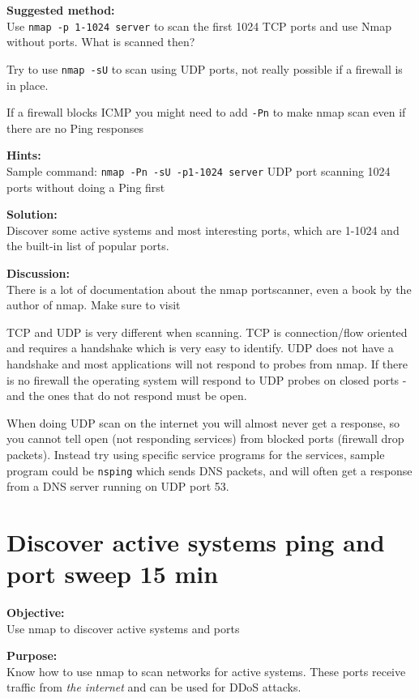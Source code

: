 \documentclass[a4paper,11pt,notitlepage]{report}
\begin{document}
{\bf Suggested method:}\\
Use \verb+nmap -p 1-1024 server+ to scan the first 1024 TCP
ports and use Nmap without ports. What is scanned then?

Try to use \verb+nmap -sU+ to scan using UDP ports, not really possible if a firewall is in place.

If a firewall blocks ICMP you might need to add \verb+-Pn+ to make nmap scan even if there are no Ping responses

{\bf Hints:} \\
Sample command: \verb+nmap -Pn -sU -p1-1024 server+ UDP port scanning
1024 ports without doing a Ping first

{\bf Solution:}\\
Discover some active systems and most interesting ports, which are 1-1024 and the built-in list of popular ports.

{\bf Discussion:}\\
There is a lot of documentation about the nmap portscanner, even a book by the author
of nmap. Make sure to visit 

TCP and UDP is very different when scanning. TCP is connection/flow oriented and requires a handshake which is very easy to identify. UDP does not have a handshake and most applications will not respond to probes from nmap. If there is no firewall the operating system will respond to UDP probes on closed ports - and the ones that do not respond must be open.

When doing UDP scan on the internet you will almost never get a response, so you cannot tell open (not responding services) from blocked ports (firewall drop packets). Instead try using specific service programs for the services, sample program could be \verb+nsping+ which sends DNS packets, and will often get a response from a DNS server running on UDP port 53.


\chapter{Discover active systems ping and port sweep 15 min}
\label{ex:nmap-pingsweep}

{\bf Objective:}\\
Use nmap to discover active systems and ports

{\bf Purpose:}\\
Know how to use nmap to scan networks for active systems. These ports receive traffic from \emph{the internet} and can be used for DDoS attacks.
\end{document}
